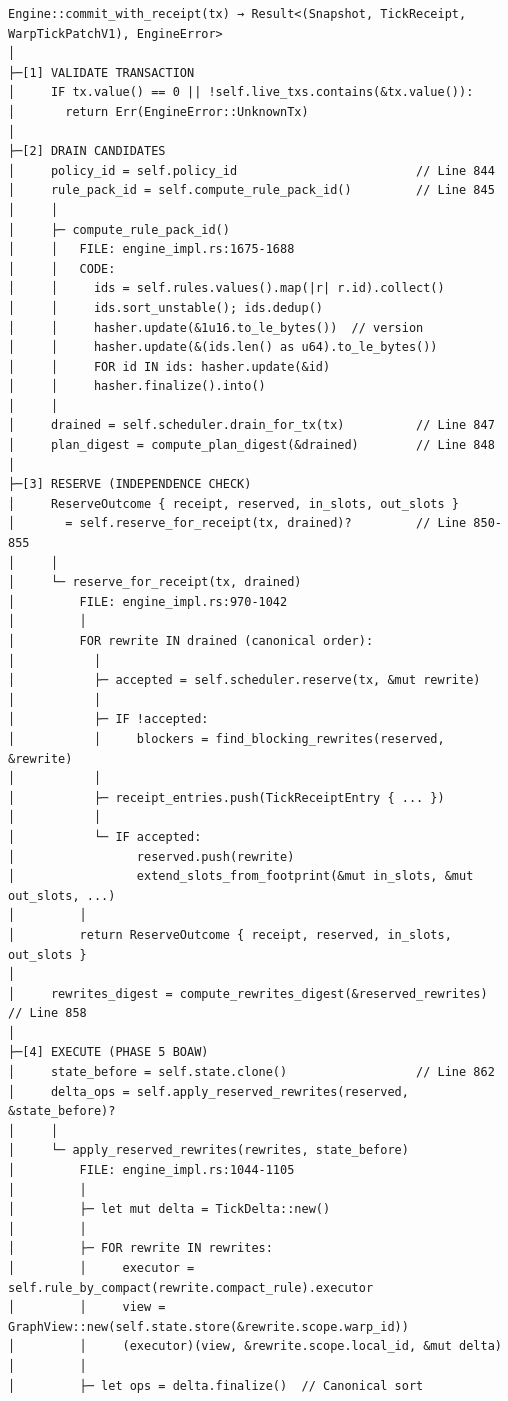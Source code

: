 \documentclass[
]{book}
\begin{document}
\begin{verbatim}
Engine::commit_with_receipt(tx) → Result<(Snapshot, TickReceipt, WarpTickPatchV1), EngineError>
│
├─[1] VALIDATE TRANSACTION
│     IF tx.value() == 0 || !self.live_txs.contains(&tx.value()):
│       return Err(EngineError::UnknownTx)
│
├─[2] DRAIN CANDIDATES
│     policy_id = self.policy_id                         // Line 844
│     rule_pack_id = self.compute_rule_pack_id()         // Line 845
│     │
│     ├─ compute_rule_pack_id()
│     │   FILE: engine_impl.rs:1675-1688
│     │   CODE:
│     │     ids = self.rules.values().map(|r| r.id).collect()
│     │     ids.sort_unstable(); ids.dedup()
│     │     hasher.update(&1u16.to_le_bytes())  // version
│     │     hasher.update(&(ids.len() as u64).to_le_bytes())
│     │     FOR id IN ids: hasher.update(&id)
│     │     hasher.finalize().into()
│     │
│     drained = self.scheduler.drain_for_tx(tx)          // Line 847
│     plan_digest = compute_plan_digest(&drained)        // Line 848
│
├─[3] RESERVE (INDEPENDENCE CHECK)
│     ReserveOutcome { receipt, reserved, in_slots, out_slots }
│       = self.reserve_for_receipt(tx, drained)?         // Line 850-855
│     │
│     └─ reserve_for_receipt(tx, drained)
│         FILE: engine_impl.rs:970-1042
│         │
│         FOR rewrite IN drained (canonical order):
│           │
│           ├─ accepted = self.scheduler.reserve(tx, &mut rewrite)
│           │
│           ├─ IF !accepted:
│           │     blockers = find_blocking_rewrites(reserved, &rewrite)
│           │
│           ├─ receipt_entries.push(TickReceiptEntry { ... })
│           │
│           └─ IF accepted:
│                 reserved.push(rewrite)
│                 extend_slots_from_footprint(&mut in_slots, &mut out_slots, ...)
│         │
│         return ReserveOutcome { receipt, reserved, in_slots, out_slots }
│
│     rewrites_digest = compute_rewrites_digest(&reserved_rewrites)  // Line 858
│
├─[4] EXECUTE (PHASE 5 BOAW)
│     state_before = self.state.clone()                  // Line 862
│     delta_ops = self.apply_reserved_rewrites(reserved, &state_before)?
│     │
│     └─ apply_reserved_rewrites(rewrites, state_before)
│         FILE: engine_impl.rs:1044-1105
│         │
│         ├─ let mut delta = TickDelta::new()
│         │
│         ├─ FOR rewrite IN rewrites:
│         │     executor = self.rule_by_compact(rewrite.compact_rule).executor
│         │     view = GraphView::new(self.state.store(&rewrite.scope.warp_id))
│         │     (executor)(view, &rewrite.scope.local_id, &mut delta)
│         │
│         ├─ let ops = delta.finalize()  // Canonical sort

\end{verbatim}
\end{document}
